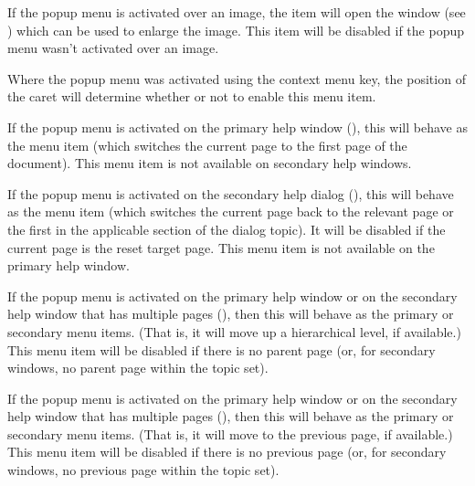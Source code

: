 
If the popup menu is activated over an image, the 
item will open the  window (see
) which can be used to enlarge the
image. This item will be disabled if the popup menu wasn't activated
over an image.

Where the popup menu was activated using the context menu
 key, 
the position of the caret will determine
whether or not to enable this menu item.


If the popup menu is activated on the primary help window
(), this will
behave as the  menu item (which
switches the current page to the first page of the document).
This menu item is not available on secondary help windows.


If the popup menu is activated on the secondary help dialog
(), this
will behave as the  menu item
(which switches the current page back to the relevant page or the
first in the applicable section of the dialog topic).
It will be disabled if the current page is the reset target page.
This menu item is not available on the primary help window.


If the popup menu is activated on the primary help window or on the
secondary help window that has multiple pages
(), then this will behave
as the primary  or
secondary  menu items. (That is, it
will move up a hierarchical level, if available.)
This menu item will be disabled if there is no parent page (or, for
secondary windows, no parent page within the topic set).


If the popup menu is activated on the primary help window or on the
secondary help window that has multiple pages
(), then this
will behave as the primary  or
secondary  menu items.  (That
is, it will move to the previous page, if available.) This menu item
will be disabled if there is no previous page (or, for secondary
windows, no previous page within the topic set).

